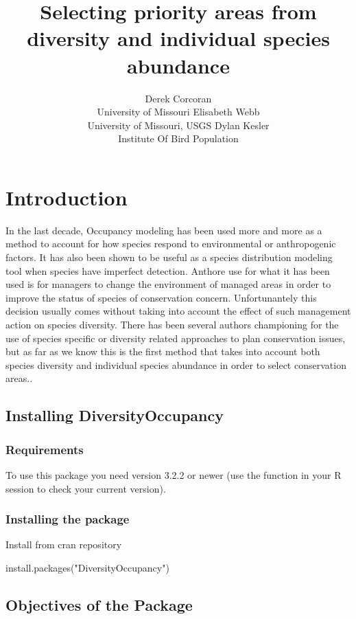 \documentclass[article]{jss}
\author{
Derek Corcoran\\University of Missouri \And Elisabeth Webb\\University of Missouri, USGS \And Dylan Kesler\\Institute Of Bird Population
}
\title{Selecting priority areas from diversity and individual species abundance
\pkg{DiversityOccupancy}}
\begin{document}
\section{Introduction}\label{introduction}

In the last decade, Occupancy modeling has been used more and more as a
method to account for how species respond to environmental or
anthropogenic factors. It has also been shown to be useful as a species
distribution modeling tool when species have imperfect detection.
Anthore use for what it has been used is for managers to change the
environment of managed areas in order to improve the status of species
of conservation concern. Unfortunantely this decision usually comes
without taking into account the effect of such management action on
species diversity. There has been several authors championing for the
use of species specific or diversity related approaches to plan
conservation issues, but as far as we know this is the first method that
takes into account both species diversity and individual species
abundance in order to select conservation
areas.\citep{mackenzie_estimating_2002}.

\subsection{Installing
DiversityOccupancy}\label{installing-diversityoccupancy}

\subsubsection{Requirements}\label{requirements}

To use this package you need  version 3.2.2 or newer (use
the function  in your R session to check your
current version).

\subsubsection{Installing the package}\label{installing-the-package}

Install from cran repository

\begin{CodeChunk}
\begin{CodeInput}
install.packages("DiversityOccupancy")
\end{CodeInput}
\end{CodeChunk}

\subsection{Objectives of the Package}\label{objectives-of-the-package}
\end{document}
